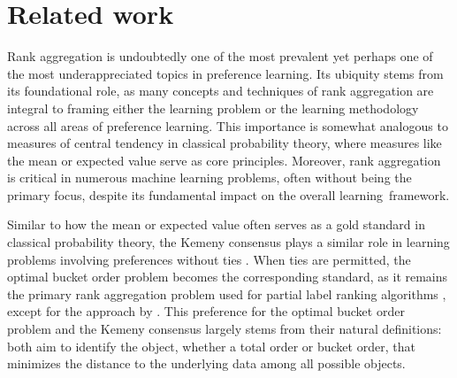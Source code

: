 \section{Related work}
\label{section:related}

Rank aggregation is undoubtedly one of the most prevalent yet perhaps one of the most underappreciated topics in preference learning. 
%
Its ubiquity stems from its foundational role, as many concepts and techniques of rank aggregation are integral to framing either the learning problem or the learning methodology across all areas of preference learning.
%
This importance is somewhat analogous to measures of central tendency in classical probability theory, where measures like the mean or expected value serve as core principles. 
%
Moreover, rank aggregation is critical in numerous machine learning problems, often without being the primary focus, despite its fundamental impact on the overall learning~framework.
%
%

Similar to how the mean or expected value often serves as a gold standard in classical probability theory, the Kemeny consensus plays a similar role in learning problems involving preferences without ties \parencite{brinker_case-based_2006, jiao_controlling_2016, korba_structured_2018}. 
%
When ties are permitted, the optimal bucket order problem becomes the corresponding standard, as it remains the primary rank aggregation problem used for partial label ranking algorithms \parencite{alfaro_learning_2021, alfaro_mixture-based_2021, alfaro_ensemble_2023, alfaro_multi-dimensional_2023, alfaro_pairwise_2023}, except for the approach by \textcite{thies_more-plr_2024}.
%
This preference for the optimal bucket order problem and the Kemeny consensus largely stems from their natural definitions: both aim to identify the object, whether a total order or bucket order, that minimizes the distance to the underlying data among all possible objects.
%
%

